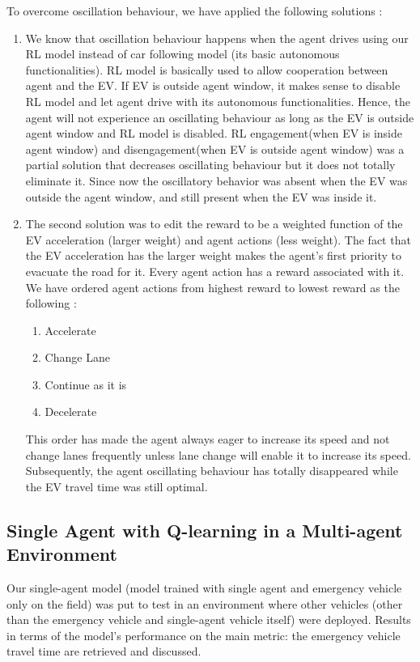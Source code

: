 \noindent To overcome oscillation behaviour, we have applied the following solutions :
\begin{enumerate}
    \item We know that oscillation behaviour happens when the agent drives using our RL model instead of car following model (its basic autonomous functionalities). RL model  is basically used  to allow cooperation between agent and the EV. If EV is outside agent window, it makes sense to disable RL model and let agent drive with its autonomous functionalities. Hence, the agent will not experience an oscillating behaviour as long as the EV is outside agent window and RL model is disabled. RL engagement(when EV is inside agent window) and disengagement(when EV is outside agent window) was a partial solution that decreases oscillating behaviour  but it does not totally eliminate it. Since now the oscillatory behavior was absent when the EV was outside the agent window, and still present when the EV was inside it.
    \item The second solution was to edit the reward to be a weighted 
     function of the EV acceleration (larger weight) and agent actions (less weight).
     The fact that the EV acceleration has the larger weight makes the agent's first priority to evacuate the road for it.
     Every agent action has a reward associated with it. We have ordered agent actions from highest reward to lowest reward as the following :
     \begin{enumerate}
         \item Accelerate
         \item Change Lane
         \item Continue as it is 
          \item Decelerate
     \end{enumerate}
       This order has made the agent always eager to increase its speed and not change lanes frequently unless lane change will enable it to increase its speed. Subsequently, the agent oscillating behaviour has totally disappeared while the EV travel time was still optimal.

\end{enumerate}



\subsection{Single Agent with Q-learning in a Multi-agent Environment}
Our single-agent model (model trained with single agent and emergency vehicle only on the field) was put to test in an environment where other vehicles (other than the emergency vehicle and single-agent vehicle itself) were deployed. Results in terms of the model's  performance on the main metric: the emergency vehicle travel time are retrieved and discussed.

